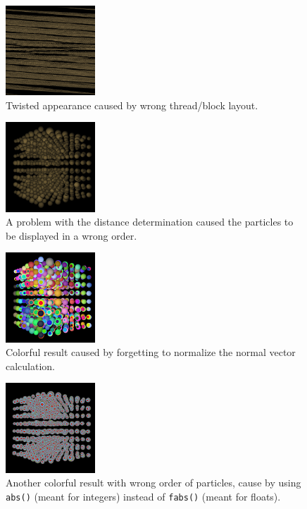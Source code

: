 \documentclass[journal]{IEEEtran}
\begin{document}
\begin{figure}[!h]
\centering
\includegraphics[width=0.30\textwidth]{bloopers/twisted.png}
\caption{Twisted appearance caused by wrong thread/block layout.}
\label{fig:twisted}
\end{figure}

\begin{figure}[!h]
\centering
\includegraphics[width=0.30\textwidth]{bloopers/wrong_order.png}
\caption{A problem with the distance determination caused the particles to be displayed in a wrong order.}
\label{fig:wrongorder}
\end{figure}

\begin{figure}[!h]
\centering
\includegraphics[width=0.30\textwidth]{bloopers/colorful.png}
\caption{Colorful result caused by forgetting to normalize the normal vector calculation.}
\label{fig:colorful}
\end{figure}

\begin{figure}[!h]
\centering
\includegraphics[width=0.30\textwidth]{bloopers/cpu_wrong_colorful.png}
\caption{Another colorful result with wrong order of particles, cause by using \texttt{abs()} (meant for integers) instead of \texttt{fabs()} (meant for floats).}
\label{fig:colorful_cpu}
\end{figure}
\end{document}
